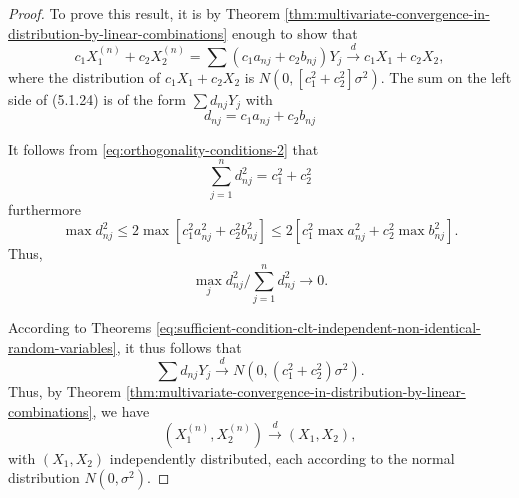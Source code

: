 \begin{proof}
	To prove this result, it is by Theorem \ref{thm:multivariate-convergence-in-distribution-by-linear-combinations} enough to show that
	\begin{equation*}
		c_{1} X_{1}^{(n)}+c_{2} X_{2}^{(n)}=\sum\left(c_{1} a_{nj}+c_{2} b_{nj}\right) Y_{j} \stackrel{d}{\rightarrow}c_{1} X_{1}+c_{2} X_{2},
	\end{equation*}
	where the distribution of $c_{1} X_{1}+c_{2} X_{2}$ is $N\left(0,\left[c_{1}^2+c_{2}^2\right] \sigma^2\right)$. The sum on the left side of (5.1.24) is of the form $\sum d_{nj} Y_{j}$ with
	\begin{equation*}
		d_{nj}=c_{1} a_{nj}+c_{2} b_{nj}
	\end{equation*}

	It follows from \eqref{eq:orthogonality-conditions-2} that
	\begin{equation*}
		\sum_{j=1}^{n}d_{nj}^2=c_{1}^2+c_{2}^2
	\end{equation*}
	furthermore
	\begin{equation*}
		\max d_{nj}^2\leq 2\max\left[c_{1}^2a_{nj}^2+c_{2}^2 b_{nj}^2\right]\leq 2\left[c_{1}^2 \max a_{nj}^2+c_{2}^2\max b_{nj}^2\right] .
	\end{equation*}
	Thus,
	\begin{equation*}
		\max_{j}d_{nj}^{2}/\sum_{j=1}^{n}d_{nj}^{2}\rightarrow 0.
	\end{equation*}

	According to Theorems \ref{eq:sufficient-condition-clt-independent-non-identical-random-variables}, it thus follows that
	\begin{equation*}
		\sum d_{nj} Y_{j} \stackrel{d}{\rightarrow}N\left(0,\left(c_{1}^2+c_{2}^2\right) \sigma^2\right).
	\end{equation*}
	Thus, by Theorem \ref{thm:multivariate-convergence-in-distribution-by-linear-combinations}, we have
	\begin{equation*}
		(X_{1}^{(n)},X_{2}^{(n)})\stackrel{d}{\rightarrow}(X_{1},X_{2}),
	\end{equation*}
	with $(X_{1},X_{2})$ independently distributed, each according to the normal distribution $N\left(0,\sigma^2\right)$.
\end{proof}
